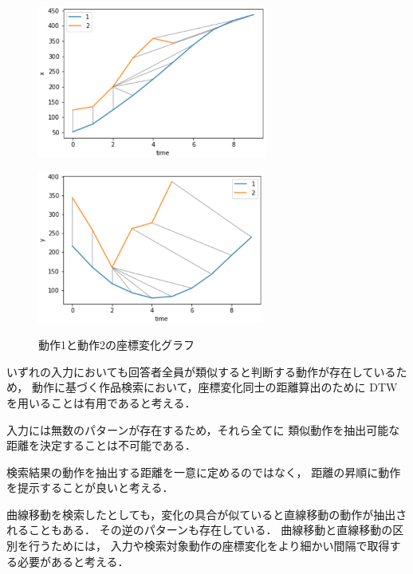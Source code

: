 \documentclass[11pt]{jreport}
\begin{document}
\begin{figure}[H]
    \centering
    \begin{minipage}{0.45\linewidth}
        \centering
        \includegraphics[height=5cm]{1-2-x.eps}
        \label{1-2-x}
    \end{minipage}
    \hspace{0.04\columnwidth}
    \begin{minipage}{0.45\linewidth}
        \centering
        \includegraphics[height=5cm]{1-2-y.eps}
        \label{1-2-y}
    \end{minipage}
    \hspace{0.04\columnwidth}
    \caption{動作1と動作2の座標変化グラフ}
    \label{1-2}
\end{figure}

いずれの入力においても回答者全員が類似すると判断する動作が存在しているため，
動作に基づく作品検索において，座標変化同士の距離算出のために
DTWを用いることは有用であると考える．

入力には無数のパターンが存在するため，それら全てに
類似動作を抽出可能な距離を決定することは不可能である．

検索結果の動作を抽出する距離を一意に定めるのではなく，
距離の昇順に動作を提示することが良いと考える．

曲線移動を検索したとしても，変化の具合が似ていると直線移動の動作が抽出されることもある．
その逆のパターンも存在している．
曲線移動と直線移動の区別を行うためには，
入力や検索対象動作の座標変化をより細かい間隔で取得する必要があると考える．
\end{document}
